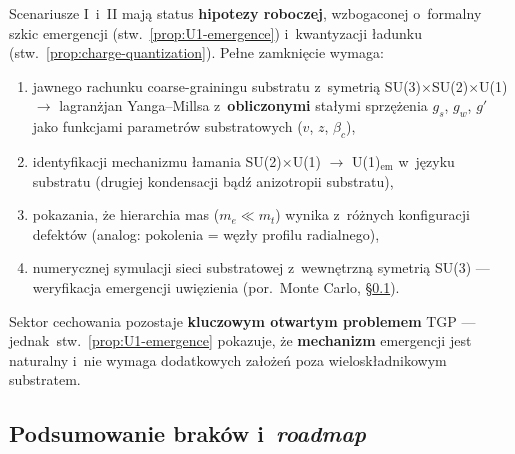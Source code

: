 \begin{remark}\label{rem:gauge-status-quant}
Scenariusze I~i~II maj\k{a} status \textbf{hipotezy roboczej},
wzbogaconej o~formalny szkic emergencji (stw.~\ref{prop:U1-emergence})
i~kwantyzacji \l{}adunku (stw.~\ref{prop:charge-quantization}).
Pe\l{}ne zamkni\k{e}cie wymaga:
\begin{enumerate}[nosep]
  \item jawnego rachunku coarse-grainingu substratu z~symetri\k{a}
    SU(3)$\times$SU(2)$\times$U(1)
    $\to$ lagran\.zjan Yanga--Millsa z~\textbf{obliczonymi}
    sta\l{}ymi sprz\k{e}\.zenia $g_s$, $g_w$, $g'$
    jako funkcjami parametr\'ow substratowych ($v$, $z$, $\beta_c$),
  \item identyfikacji mechanizmu \l{}amania SU(2)$\times$U(1)
    $\to$ U(1)$_{\mathrm{em}}$ w~j\k{e}zyku substratu
    (drugiej kondensacji b\k{a}d\'z anizotropii substratu),
  \item pokazania, \.ze hierarchia mas ($m_e \ll m_t$)
    wynika z~r\'o\.znych konfiguracji defekt\'ow
    (analog: pokolenia = w\k{e}z\l{}y profilu radialnego),
  \item numerycznej symulacji sieci substratowej
    z~wewn\k{e}trzn\k{a} symetri\k{a} SU(3) ---
    weryfikacja emergencji uwi\k{e}zienia
    (por.\ Monte Carlo, \S\ref{ssec:roadmap}).
\end{enumerate}
Sektor cechowania pozostaje \textbf{kluczowym otwartym problemem}
TGP --- jednak~stw.~\ref{prop:U1-emergence} pokazuje,
\.ze \textbf{mechanizm} emergencji jest naturalny
i~nie wymaga dodatkowych za\l{}o\.ze\'n poza
wielosk\l{}adnikowym substratem.
\end{remark}

\subsection{Podsumowanie brak\'ow i~\emph{roadmap}}\label{ssec:roadmap}

